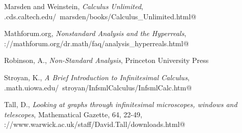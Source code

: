 Marsden and Weinstein, \emph{Calculus Unlimited}, \verb@www.cds.caltech.edu/~marsden/books/Calculus_Unlimited.html@

Mathforum.org, \emph{Nonstandard Analysis and the Hyperreals}, \verb@http://mathforum.org/dr.math/faq/analysis_hyperreals.html@

Robinson, A., \emph{Non-Standard Analysis}, Princeton University Press

Stroyan, K., \emph{A Brief Introduction to Infinitesimal Calculus}, \verb@www.math.uiowa.edu/~stroyan/InfsmlCalculus/InfsmlCalc.htm@

Tall, D., \emph{Looking at graphs through infinitesimal microscopes, windows and telescopes}, Mathematical Gazette, 64, 22-49, 
\verb@http://www.warwick.ac.uk/staff/David.Tall/downloads.html@
